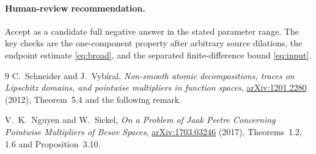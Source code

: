 \documentclass[9pt]{extarticle}
\begin{document}
\paragraph{Human-review recommendation.}
Accept as a candidate full negative answer in the stated parameter range.
The key checks are the one-component property after arbitrary source
dilations, the endpoint estimate \eqref{eq:broad}, and the separated
finite-difference bound \eqref{eq:input}.

\begin{thebibliography}{9}
C.~Schneider and J.~Vyb\'iral,
\emph{Non-smooth atomic decompositions, traces on Lipschitz domains, and
pointwise multipliers in function spaces},
\href{https://arxiv.org/abs/1201.2280}{arXiv:1201.2280} (2012),
Theorem~5.4 and the following remark.

V.~K.~Nguyen and W.~Sickel,
\emph{On a Problem of Jaak Peetre Concerning Pointwise Multipliers of
Besov Spaces},
\href{https://arxiv.org/abs/1703.03246}{arXiv:1703.03246} (2017),
Theorems~1.2, 1.6 and Proposition~3.10.
\end{thebibliography}
\end{document}
